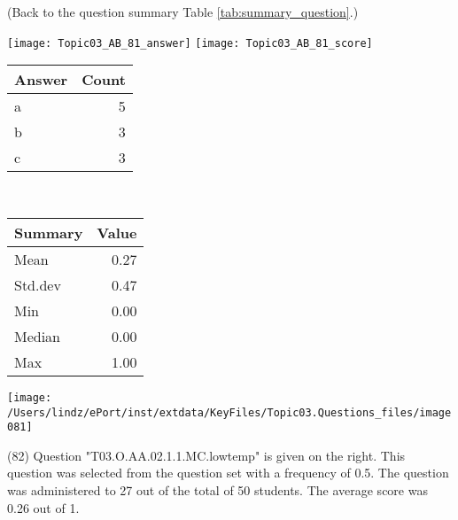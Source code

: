 \documentclass[12pt,english,nohyper]{tufte-handout}\usepackage[]{graphicx}\usepackage[]{color}
\begin{document}
 (Back to the question summary Table \ref{tab:summary_question}.)

\begin{center} \texttt{[image: Topic03\_AB\_81\_answer]} \texttt{[image: Topic03\_AB\_81\_score]} \end{center} 

\begin{center}%
\begin{tabular}{lr}
  \hline
Answer & Count \\ 
  \hline
a &   5 \\ 
  b &   3 \\ 
  c &   3 \\ 
   \hline
\end{tabular}
~~~~~~~~%
\begin{tabular}{lr}
  \hline
Summary & Value \\ 
  \hline
Mean & 0.27 \\ 
  Std.dev & 0.47 \\ 
  Min & 0.00 \\ 
  Median & 0.00 \\ 
  Max & 1.00 \\ 
   \hline
\end{tabular}
\end{center}\newpage{}



\vspace{4cm}\begin{marginfigure}\texttt{[image: /Users/lindz/ePort/inst/extdata/KeyFiles/Topic03.Questions\_files/image081]}\end{marginfigure}\vspace{-4cm} (82) Question "T03.O.AA.02.1.1.MC.lowtemp" is given on the right. This question was selected from the question set with a frequency of 0.5. The question was administered to 27 out of the total of 50 students. The average score was 0.26 out of 1.
\end{document}
